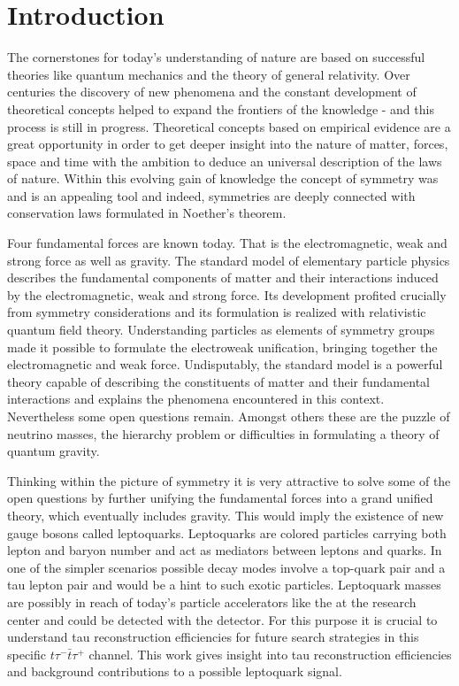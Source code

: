 \tableofcontents
\chapter{Introduction}
The cornerstones for today's understanding of nature are based on successful theories like quantum mechanics and the theory of general relativity. Over centuries the discovery of new phenomena and the constant development of theoretical concepts helped to expand the frontiers of the knowledge - and this process is still in progress. Theoretical concepts based on empirical evidence are a great opportunity in order to get deeper insight into the nature of matter, forces, space and time with the ambition to deduce an universal description of the laws of nature. Within this evolving gain of knowledge the concept of symmetry was and is an appealing tool and indeed, symmetries are deeply connected with conservation laws formulated in Noether's theorem.\par
Four fundamental forces are known today. That is the electromagnetic, weak and strong force as well as gravity. The standard model of elementary particle physics describes the fundamental components of matter and their interactions induced by the electromagnetic, weak and strong force. Its development profited crucially from symmetry considerations and its formulation is realized with relativistic quantum field theory. Understanding particles as elements of symmetry groups made it possible to formulate the electroweak unification, bringing together the electromagnetic and weak force. Undisputably, the standard model is a powerful theory capable of describing the constituents of matter and their fundamental interactions and explains the phenomena encountered in this context. Nevertheless some open questions remain. Amongst others these are the puzzle of neutrino masses, the hierarchy problem or difficulties in formulating a theory of quantum gravity.\par
Thinking within the picture of symmetry it is very attractive to solve some of the open questions by further unifying the fundamental forces into a grand unified theory, which eventually includes gravity. This would imply the existence of new gauge bosons called leptoquarks. Leptoquarks are colored particles carrying both lepton and baryon number and act as mediators between leptons and quarks. In one of the simpler scenarios possible decay modes involve a top-quark pair and a tau lepton pair and would be a hint to such exotic particles. Leptoquark masses are possibly in reach of today's particle accelerators like the {\LHC} at the research center {\CERN} and could be detected with the {\ATLAS} detector. For this purpose it is crucial to understand tau reconstruction efficiencies for future search strategies in this specific $t\tau^-\bar{t}\tau^+$ channel. This work gives insight into tau reconstruction efficiencies and background contributions to a possible leptoquark signal.\par
